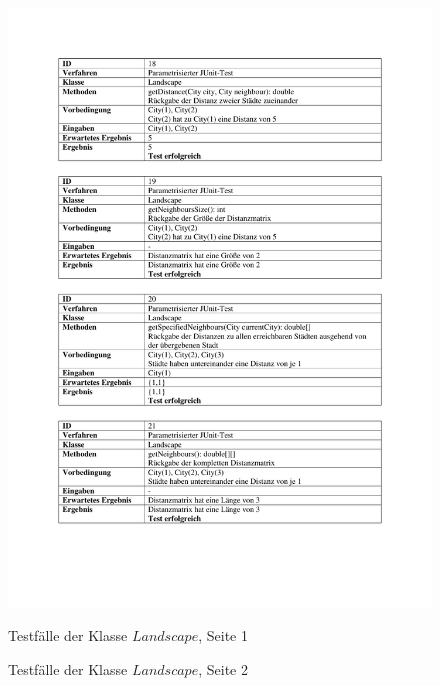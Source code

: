 \begin{appendices}
	\begin{figure}[h]
		\centering
		\caption{Testfälle der Klasse $Landscape$, Seite 1}
		\includegraphics[width=\linewidth]{images/Testfaelle_Landscape_Seite_1.pdf}
		\label{testLandscape1}
	\end{figure}
	\begin{figure}[h]
		\centering
		\caption{Testfälle der Klasse $Landscape$, Seite 2}

\end{figure}
\end{appendices}
